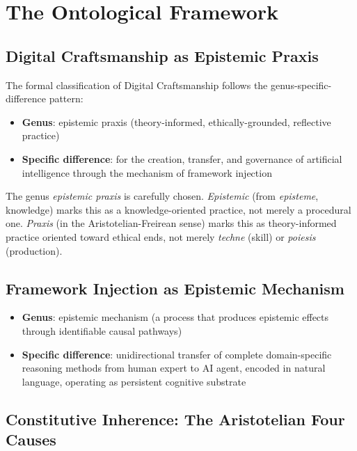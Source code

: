 \documentclass[12pt,a4paper]{article}
\begin{document}
\section{The Ontological Framework}
\label{sec:ontology}

\subsection{Digital Craftsmanship as Epistemic Praxis}

The formal classification of Digital Craftsmanship follows the genus-specific-difference pattern:

\begin{itemize}
  \item \textbf{Genus}: epistemic praxis (theory-informed, ethically-grounded, reflective practice)
  \item \textbf{Specific difference}: for the creation, transfer, and governance of artificial intelligence through the mechanism of framework injection
\end{itemize}

The genus \emph{epistemic praxis} is carefully chosen. \emph{Epistemic} (from \emph{episteme}, knowledge) marks this as a knowledge-oriented practice, not merely a procedural one. \emph{Praxis} (in the Aristotelian-Freirean sense) marks this as theory-informed practice oriented toward ethical ends, not merely \emph{techne} (skill) or \emph{poiesis} (production).

\subsection{Framework Injection as Epistemic Mechanism}

\begin{itemize}
  \item \textbf{Genus}: epistemic mechanism (a process that produces epistemic effects through identifiable causal pathways)
  \item \textbf{Specific difference}: unidirectional transfer of complete domain-specific reasoning methods from human expert to AI agent, encoded in natural language, operating as persistent cognitive substrate
\end{itemize}

\subsection{Constitutive Inherence: The Aristotelian Four Causes}
\end{document}
